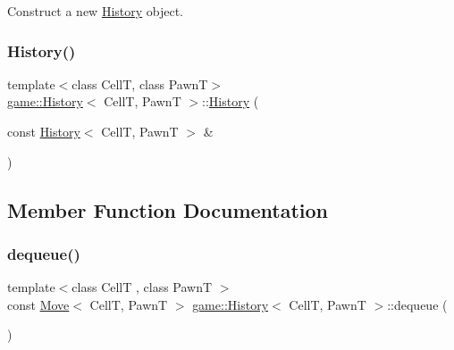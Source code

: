 Construct a new \hyperlink{classgame_1_1_history}{History} object. 

\mbox{\label{classgame_1_1_history_a78704fa143785251e49eb67f0bea6d14}} 
\subsubsection{\texorpdfstring{History()}{History()}\hspace{0.1cm}{\footnotesize\ttfamily [2/2]}}
{\footnotesize\ttfamily template$<$class CellT, class PawnT$>$ \\
\hyperlink{classgame_1_1_history}{game\+::\+History}$<$ CellT, PawnT $>$\+::\hyperlink{classgame_1_1_history}{History} (\begin{DoxyParamCaption}\item[{const \hyperlink{classgame_1_1_history}{History}$<$ CellT, PawnT $>$ \&}]{ }\end{DoxyParamCaption})\hspace{0.3cm}{\ttfamily [delete]}}



\subsection{Member Function Documentation}
\mbox{\label{classgame_1_1_history_aee23b3221bfdb6b373cac8692b8cfb20}} 
\subsubsection{\texorpdfstring{dequeue()}{dequeue()}}
{\footnotesize\ttfamily template$<$class CellT , class PawnT $>$ \\
const \hyperlink{structgame_1_1_move}{Move}$<$ CellT, PawnT $>$ \hyperlink{classgame_1_1_history}{game\+::\+History}$<$ CellT, PawnT $>$\+::dequeue (\begin{DoxyParamCaption}{ }\end{DoxyParamCaption})}

\mbox{\label{classgame_1_1_history_a9bbe268b150e8ae99e483fb53fca06fa}} 
